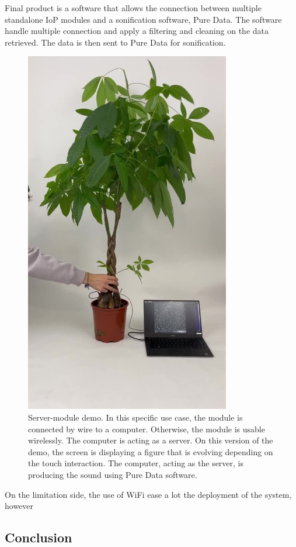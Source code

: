 Final product is a software that allows the connection between multiple standalone IoP modules and a sonification
software, Pure Data. The software handle multiple connection and apply a filtering and cleaning on the data 
retrieved. The data is then sent to Pure Data for sonification.

\begin{figure}[h!]
    \centering
    \includegraphics[width=0.8\textwidth]{images/standalone_demo.jpg}
    \caption{Server-module demo. In this specific use case, the module is connected by wire to a computer.
    Otherwise, the module is usable wirelessly. 
    The computer is acting as a server.
    On this version of the demo, the screen is displaying a figure that is evolving depending on the touch interaction.
    The computer, acting as the server, is producing the sound using Pure Data software.} 
    \vspace{0.1cm}
    \label{fig:standalone_demo}
\end{figure}

On the limitation side, the use of WiFi ease a lot the deployment of the system, however

\subsection{Conclusion}

